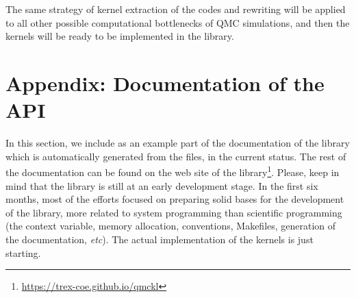 The same strategy of kernel extraction of the codes and rewriting
will be applied to all other possible computational bottlenecks of QMC
simulations, and then the kernels will be ready to be implemented in
the library.




\appendix
\section{Appendix: Documentation of the API}

In this section, we include as an example part of the documentation of
the library which is automatically generated from the {\orgmode}
files, in the current status. The rest of the documentation can be
found on the web site of the library\footnote{\url{https://trex-coe.github.io/qmckl}}.
Please, keep in mind that the library is still at an early development
stage. In the first six months, most of the efforts focused on
preparing solid bases for the development of
the library, more related to system programming than scientific
programming (the context variable, memory allocation, conventions,
Makefiles, generation of the documentation, \textit{etc}). The actual
implementation of the kernels is just starting.


\clearpage


